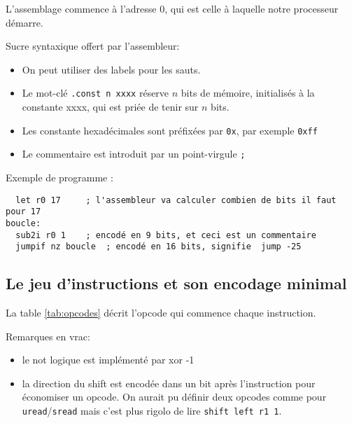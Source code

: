 \documentclass[architecture]{compas2018}
\begin{document}
L'assemblage commence à l'adresse 0, qui est celle à laquelle notre processeur démarre.

 
Sucre syntaxique offert par l'assembleur:
\begin{itemize}
\item On peut utiliser des labels pour les sauts.
\item Le mot-clé \texttt{.const n xxxx}  réserve $n$ bits de mémoire, initialisés à la constante xxxx, qui est priée de tenir sur $n$ bits.
\item Les constante hexadécimales sont préfixées par \texttt{0x}, par exemple \texttt{0xff}
\item Le commentaire est introduit par un point-virgule \texttt{;}
\end{itemize}
 

Exemple de programme :
\begin{verbatim}
  let r0 17     ; l'assembleur va calculer combien de bits il faut pour 17
boucle:	
  sub2i r0 1    ; encodé en 9 bits, et ceci est un commentaire
  jumpif nz boucle  ; encodé en 16 bits, signifie  jump -25 
\end{verbatim}

\subsection{Le jeu d'instructions et son encodage minimal}



La table \ref{tab:opcodes} décrit l'opcode qui commence chaque instruction.

Remarques en vrac: 
\begin{itemize}
\item le not logique est implémenté par xor -1
\item la direction du shift est encodée dans un bit après l'instruction pour économiser un opcode. On aurait pu définir deux opcodes comme pour \texttt{uread}/\texttt{sread} mais c'est plus rigolo de lire \texttt{shift left r1 1}.
\end{itemize}
\end{document}
